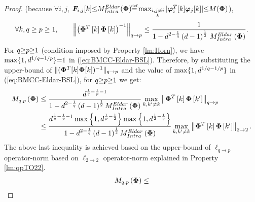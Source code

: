 \begin{proof}
{
\label{cmmnt:77-2} 
 (because $\forall i,j$, $\boldsymbol{F}_{i,j}[k] \sleq M^{Eldar}_{Intra}(\myPhi) {\myeq} \max_{\substack{i,j \neq i \\ k}} \vert \myphi_i ^T [k] \myphi_j [k] \vert \sleq M(\myPhi)$), 
}
\begin{gather*}
\forall k, q \geq p \geq 1, \qquad
\left\lVert\left( \boldsymbol{\Phi}^T \left[ k \right] \boldsymbol{\Phi} \left[ k \right] \right)^{-1}\right\rVert_{q \to p} 
\leq \frac{1}{1-  d^{2 - \frac1q} \left( d - 1 \right)^\frac12 \, M^{Eldar}_{Intra}\left( \boldsymbol{\Phi} \right)}.
\end{gather*}
For $q {\geq} p {\geq} 1$ (condition imposed by Property \ref{lm:Horn}), we have $\max \{1 , d^{1/q {-} 1/p} \} {=} 1$ in (\ref{eq:BMCC-Eldar-BSL}). 
Therefore, by substituting the upper-bound of $\Vert (\boldsymbol{\Phi}^T [k] \boldsymbol{\Phi} [k])^{-1} \Vert_{q \to p}$ and the value of $\max \{1 , d^{1/q {-} 1/p} \}$ in (\ref{eq:BMCC-Eldar-BSL}), for $q {\geq} p {\geq} 1$ we get:
\begin{gather*}
\begin{aligned}
M_{q,p}\left( \boldsymbol{\Phi} \right) &\leq 
\frac{d^{\frac1q - \frac1p -1 }}{1- d^{2 - \frac1q} \left( d - 1 \right)^\frac12 M^{Eldar}_{Intra}\left( \boldsymbol{\Phi} \right)} \max_{k,k' \neq k}  \left\lVert\boldsymbol{\Phi}^T \left[ k \right] \boldsymbol{\Phi} \left[ k' \right]\right\rVert_{q \to p}\\
&\leq \frac{d^{\frac1q - \frac1p -1 } \max \left\lbrace 1 , d^{\frac1p - \frac{1}{2}} \right\rbrace \max \left\lbrace 1 , d^{\frac{1}{2} - \frac1q} \right\rbrace}{1-  d^{2 - \frac1q} \left( d - 1 \right)^\frac12 M^{Eldar}_{Intra}\left( \boldsymbol{\Phi} \right)} \max_{k,k' \neq k} \left\lVert\boldsymbol{\Phi}^T \left[ k \right] \boldsymbol{\Phi} \left[ k' \right]\right\rVert_{2 \to 2}.
\end{aligned}
\end{gather*}
The above last inequality is achieved based on the upper-bound of $\ell_{q \to p}$ operator-norm based on $\ell_{2 \to 2}$ operator-norm explained in Property \ref{lm:qpTO22}.
\begin{gather*}
\label{cmmnt:78} 
\mycolor{M_{q,p}\myparanthese{\myPhi} \leq 
}
\end{gather*}
\end{proof}
